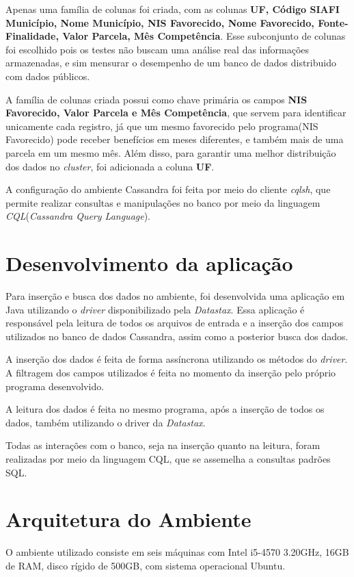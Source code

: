 Apenas uma família de colunas foi criada, com as colunas \textbf{UF, Código SIAFI Município, Nome Município, NIS Favorecido, Nome Favorecido, Fonte-Finalidade, Valor Parcela, Mês Competência}. Esse subconjunto de colunas foi escolhido pois os testes não buscam uma análise real das informações armazenadas, e sim mensurar o desempenho de um banco de dados distribuido com dados públicos.

A família de colunas criada possui como chave primária os campos \textbf{NIS Favorecido, Valor Parcela e Mês Competência}, que servem para identificar unicamente cada registro, já que um mesmo favorecido pelo programa(NIS Favorecido) pode receber benefícios em meses diferentes, e também mais de uma parcela em um mesmo mês. Além disso, para garantir uma melhor distribuição dos dados no \emph{cluster}, foi adicionada a coluna \textbf{UF}. 


A configuração do ambiente Cassandra foi feita por meio do cliente \emph{cqlsh}, que permite realizar consultas e manipulações no banco por meio da linguagem \emph{CQL}(\emph{Cassandra Query Language}).

\section{Desenvolvimento da aplicação}
Para inserção e busca dos dados no ambiente, foi desenvolvida uma aplicação em Java utilizando o \emph{driver} disponibilizado pela \emph{Datastax}. Essa aplicação é responsável pela leitura de todos os arquivos de entrada e a inserção dos campos utilizados no banco de dados Cassandra, assim como a posterior busca dos dados.

A inserção dos dados é feita de forma assíncrona utilizando os métodos do \emph{driver}. A filtragem dos campos utilizados é feita no momento da inserção pelo próprio programa desenvolvido.

A leitura dos dados é feita no mesmo programa, após a inserção de todos os dados, também utilizando o driver da \emph{Datastax}.

Todas as interações com o banco, seja na inserção quanto na leitura, foram realizadas por meio da linguagem CQL, que se assemelha a consultas padrões SQL.

\section{Arquitetura do Ambiente}
O ambiente utilizado consiste em seis máquinas com Intel i5-4570 3.20GHz, 16GB de RAM, disco rígido de 500GB, com sistema operacional Ubuntu.


